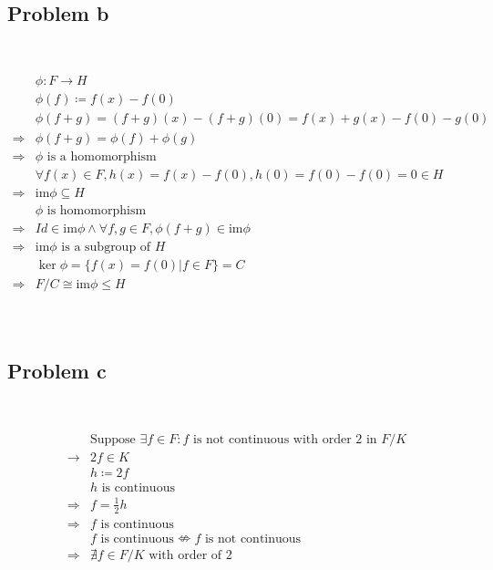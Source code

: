 \documentclass{article}
\begin{document}
~

\subsection*{Problem b}

~

\begin{equation*}
    \begin{split}
        &\phi:F\rightarrow H\\
        &\phi(f)\coloneqq f(x)-f(0)\\
        &\phi(f+g)=(f+g)(x)-(f+g)(0)=f(x)+g(x)-f(0)-g(0)\\
        \Rightarrow&\phi(f+g)=\phi(f)+\phi(g)\\
        \Rightarrow&\phi\text{ is a homomorphism}\\
        &\forall f(x)\in F,h(x)=f(x)-f(0),h(0)=f(0)-f(0)=0\in H\\
        \Rightarrow&\text{im}\phi\subseteq H\\
        &\phi\text{ is homomorphism}\\
        \Rightarrow&Id\in \text{im}\phi\land \forall f,g\in F,\phi(f+g)\in \text{im}\phi \\
        \Rightarrow&\text{im}\phi\text{ is a subgroup of }H\\
        &\ker\phi=\{f(x)=f(0)|f\in F\}=C\\
        \Rightarrow&F/C\cong\text{im}\phi\leqslant H\\
    \end{split}
\end{equation*}

~

\subsection*{Problem c}

~

\begin{equation*}
    \begin{split}
        &\text{Suppose }\exists f\in F: f\text{ is not continuous with order 2 in }F/K\\
        \rightarrow&2f\in K\\
        &h\coloneqq 2f\\
        &h\text{ is continuous}\\
        \Rightarrow&f=\frac{1}{2}h\\
        \Rightarrow&f\text{ is continuous}\\
        &f\text{ is continuous}\nLeftrightarrow f\text{ is not continuous}\\
        \Rightarrow&\nexists f\in F/K\text{ with order of 2}\\
    \end{split}
\end{equation*}
\end{document}
